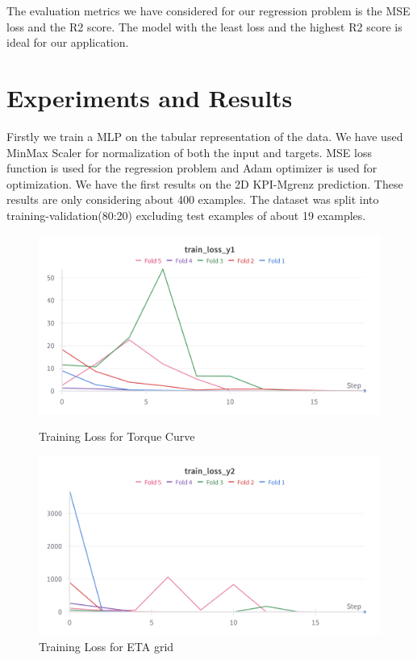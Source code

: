 \documentclass{report} %
\begin{document}
The evaluation metrics we have considered for our regression problem is the MSE loss and the R2 score.
The model with the least loss and the highest R2 score is ideal for our application.

\newpage 

\chapter*{Experiments and Results}
Firstly we train a MLP on the tabular representation of the data.
We have used MinMax Scaler for normalization of both the input and targets.
MSE loss function is used for the regression problem and Adam optimizer is used for optimization.
We have the first results on the 2D KPI-Mgrenz prediction.
These results are only considering about 400 examples. The dataset was split into training-validation(80:20) excluding test examples of about 19 examples.
\begin{figure}[h]
    \centering
    \begin{minipage}[b]{0.3\textwidth}
        \includegraphics[width=\textwidth]{./ReportImages/train_loss_y1.png}
        \caption{Training Loss for Torque Curve}
        \label{fig:Training Loss for Torque Curve}
    \end{minipage}
    \hfill
    \begin{minipage}[b]{0.3\textwidth}
        \includegraphics[width=\textwidth]{./ReportImages/train_loss_y2.png}
        \caption{Training Loss for ETA grid}
        \label{fig:Training Loss for ETA grid}
    \end{minipage}
\end{figure}
\end{document}
